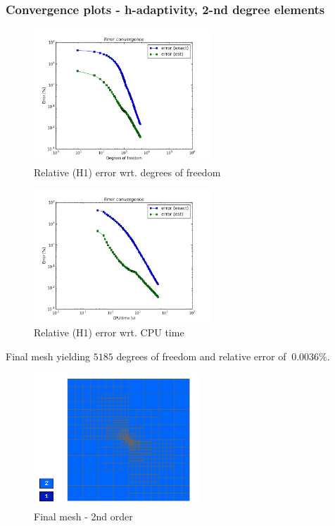 		\subsubsection{Convergence plots - h-adaptivity, 2-nd degree elements}
			\begin{figure}[H]
				\centering
				\includegraphics[height=5cm]{img/kellog-h2-dof.png}
				\caption{Relative (H1) error wrt. degrees of freedom}
			\end{figure}
			
			\begin{figure}[H]
				\centering
				\includegraphics[height=5cm]{img/kellog-h2-cpu.png}
				\caption{Relative (H1) error wrt. CPU time}
			\end{figure}
			
			Final mesh yielding $5185$ degrees of freedom and relative error of $~0.0036\%$.
			\begin{figure}[H]
				\centering
				\includegraphics[height=5cm]{img/kellog-h2-finalmesh.png}
				\caption{Final mesh - 2nd order}
			\end{figure}
			
